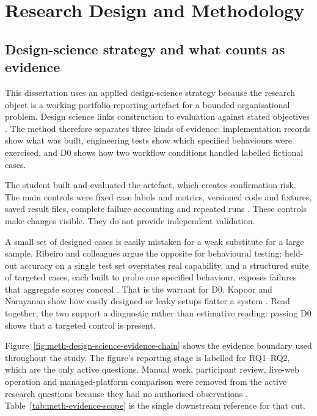 \chapter{Research Design and Methodology}
\section{Design-science strategy and what counts as evidence}

This dissertation uses an applied design-science strategy because the research object is a working
portfolio-reporting artefact for a bounded organisational problem. Design science links construction
to evaluation against stated objectives \citep{hevner2004design,peffers2007dsrm}. The method therefore
separates three kinds of evidence: implementation records show what was built, engineering tests show
which specified behaviours were exercised, and D0 shows how two workflow conditions handled labelled
fictional cases.

The student built and evaluated the artefact, which creates confirmation risk. The main controls were
fixed case labels and metrics, versioned code and fixtures, saved result files, complete failure
accounting and repeated runs \citep{pineau2021reproducibility,nist2023airmf}. These controls make
changes visible. They do not provide independent validation.

A small set of designed cases is easily mistaken for a weak substitute for a large sample. Ribeiro
and colleagues argue the opposite for behavioural testing: held-out accuracy on a single test set
overstates real capability, and a structured suite of targeted cases, each built to probe one
specified behaviour, exposes failures that aggregate scores conceal \citep{ribeiro2020checklist}.
That is the warrant for D0. Kapoor and Narayanan show how easily designed or leaky setups flatter a
system \citep{kapoor2023leakage}. Read together, the two support a diagnostic rather than estimative
reading: passing D0 shows that a targeted control is present.

Figure~\ref{fig:meth-design-science-evidence-chain} shows the evidence boundary used throughout the
study. The figure's reporting stage is labelled for RQ1--RQ2, which are the only active questions.
Manual work, participant review, live-web operation and managed-platform comparison were
removed from the active research questions because they had no authorised observations
\citep{nist2023airmf,hevner2004design}. Table~\ref{tab:meth-evidence-scope} is the single downstream
reference for that cut.

